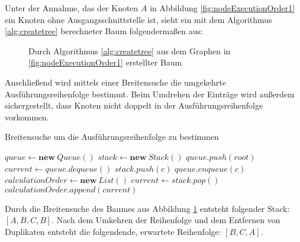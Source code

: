 Unter der Annahme, das der Knoten $A$ in Abbildung \ref{fig:nodeExecutionOrder1} ein Knoten ohne Ausgangsschnittstelle ist, sieht ein mit dem Algorithmus \ref{alg:createtree} berechneter Baum folgendermaßen aus:

\begin{figure}[H]
    \centering
    \caption{Durch Algorithmus \ref{alg:createtree} aus dem Graphen in \ref{fig:nodeExecutionOrder1} erstellter Baum}
    \label{fig:nodeExecutionOrder2}
\end{figure}

Anschließend wird mittels einer Breitensuche die umgekehrte Ausführungsreihenfolge bestimmt. Beim Umdrehen der Einträge wird außerdem sichergestellt, dass Knoten nicht doppelt in der Ausführungsreihenfolge vorkommen.

\begin{algorithm}[H]
    \caption{Breitensuche um die Ausführungsreihenfolge zu bestimmen}
    \begin{algorithmic}[1]
        \State $queue \gets \textbf{new} \ Queue()$
        \State $stack \gets \textbf{new} \ Stack()$
        \State $queue.push(root)$
            \State $current \gets queue.dequeue()$
                \State $stack.push(c)$
                \State $queue.enqueue(c)$
            \EndFor
        \EndWhile
        \State $calculationOrder \gets \textbf{new} \ List()$
            \State $current \gets stack.pop()$
                \State $calculationOrder.append(current)$
            \EndIf
        \EndWhile
    \end{algorithmic}
\end{algorithm}

Durch die Breitensuche des Baumes aus Abbildung \ref{fig:nodeExecutionOrder2} entsteht folgender Stack: $[A, B, C, B]$. Nach dem Umkehren der Reihenfolge und dem Entfernen von Duplikaten entsteht die folgendende, erwartete Reihenfolge: $[B, C, A]$.

